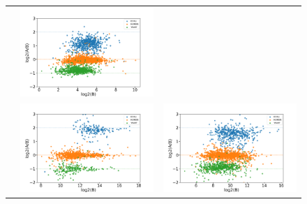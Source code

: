 \documentclass[11pt]{article}
\begin{document}
\begin{figure}[hbt]
\begin{tabular}{   >{\centering\arraybackslash} m{3cm} V V}
                & \includegraphics[width=\linewidth]{../../result/report_plots_pipeline/scatter_PS_msstats.png} \\ 
        {}    & \includegraphics[width=\linewidth]{../../result/report_plots_pipeline/scatter_ID_top3.png}
                & \includegraphics[width=\linewidth]{../../result/report_plots_pipeline/scatter_PS_top3.png} 

\end{tabular}
\end{figure}
\end{document}
